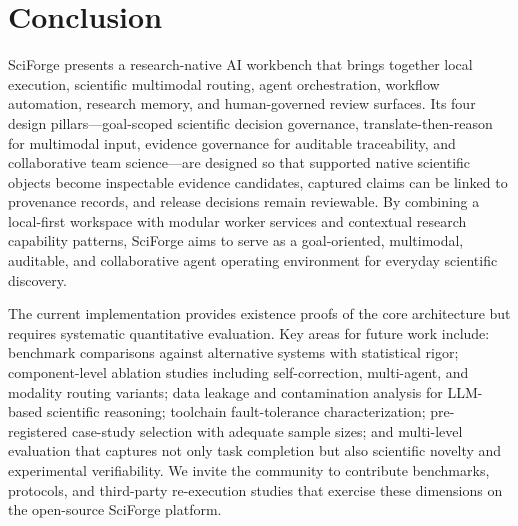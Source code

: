 \documentclass[sn-basic,Numbered,pdflatex]{sn-jnl}
\begin{document}
\section{Conclusion}


SciForge presents a research-native AI workbench that brings together local execution, scientific multimodal routing, agent orchestration, workflow automation, research memory, and human-governed review surfaces. Its four design pillars---goal-scoped scientific decision governance, translate-then-reason for multimodal input, evidence governance for auditable traceability, and collaborative team science---are designed so that supported native scientific objects become inspectable evidence candidates, captured claims can be linked to provenance records, and release decisions remain reviewable. By combining a local-first workspace with modular worker services and contextual research capability patterns, SciForge aims to serve as a goal-oriented, multimodal, auditable, and collaborative agent operating environment for everyday scientific discovery.

The current implementation provides existence proofs of the core architecture but requires systematic quantitative evaluation. Key areas for future work include: benchmark comparisons against alternative systems with statistical rigor; component-level ablation studies including self-correction, multi-agent, and modality routing variants; data leakage and contamination analysis for LLM-based scientific reasoning; toolchain fault-tolerance characterization; pre-registered case-study selection with adequate sample sizes; and multi-level evaluation that captures not only task completion but also scientific novelty and experimental verifiability. We invite the community to contribute benchmarks, protocols, and third-party re-execution studies that exercise these dimensions on the open-source SciForge platform.
\end{document}
